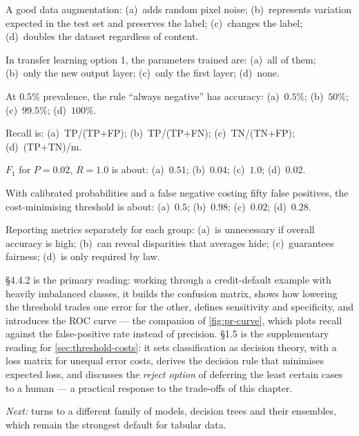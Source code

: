 \qz A good data augmentation: (a)~adds random pixel noise; (b)~represents
variation expected in the test set and preserves the label; (c)~changes the
label; (d)~doubles the dataset regardless of content.

\qz In transfer learning option 1, the parameters trained are: (a)~all of them;
(b)~only the new output layer; (c)~only the first layer; (d)~none.

\qz At $0.5\%$ prevalence, the rule ``always negative'' has accuracy:
(a)~$0.5\%$; (b)~$50\%$; (c)~$99.5\%$; (d)~$100\%$.

\qz Recall is: (a)~TP/(TP+FP); (b)~TP/(TP+FN); (c)~TN/(TN+FP); (d)~(TP+TN)/m.

\qz $F_1$ for $P = 0.02$, $R = 1.0$ is about: (a)~$0.51$; (b)~$0.04$;
(c)~$1.0$; (d)~$0.02$.

\qz With calibrated probabilities and a false negative costing fifty false
positives, the cost-minimising threshold is about: (a)~$0.5$; (b)~$0.98$;
(c)~$0.02$; (d)~$0.28$.

\qz Reporting metrics separately for each group: (a)~is unnecessary if overall
accuracy is high; (b)~can reveal disparities that averages hide; (c)~guarantees
fairness; (d)~is only required by law.

\furtherreading

\textcite{james2021} §4.4.2 is the primary reading: working through a
credit-default example with heavily imbalanced classes, it builds the confusion
matrix, shows how lowering the threshold trades one error for the other, defines
sensitivity and specificity, and introduces the ROC curve --- the companion of
\cref{fig:pr-curve}, which plots recall against the false-positive rate instead
of precision. \textcite{bishop2006} §1.5 is the supplementary reading for
\cref{sec:threshold-costs}: it sets classification as decision theory, with a
loss matrix for unequal error costs, derives the decision rule that minimises
expected loss, and discusses the \emph{reject option} of deferring the least
certain cases to a human --- a practical response to the trade-offs of this
chapter.

\bigskip
\noindent\emph{Next:}  turns to a different family of models,
decision trees and their ensembles, which remain the strongest default for
tabular data.
